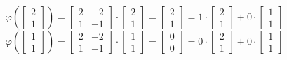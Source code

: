 \documentclass[a4paper, 12pt]{report}
\begin{document}
        $$
        \varphi\left(
            \begin{bmatrix}
                2\\
                1
            \end{bmatrix}\right)=
            \begin{bmatrix}
                2 & -2\\
                1 & -1
            \end{bmatrix}\cdot
            \begin{bmatrix}
                2\\
                1
            \end{bmatrix}=
            \begin{bmatrix}
                2\\
                1
            \end{bmatrix}
            =1 \cdot
            \begin{bmatrix}
                2\\
                1
            \end{bmatrix}
            +0\cdot
            \begin{bmatrix}
                1\\
                1
            \end{bmatrix}
        $$
        $$
        \varphi\left(
            \begin{bmatrix}
                1\\
                1
            \end{bmatrix}\right)=
            \begin{bmatrix}
                2 & -2\\
                1 & -1
            \end{bmatrix}\cdot
            \begin{bmatrix}
                1\\
                1
            \end{bmatrix}=
            \begin{bmatrix}
                0\\
                0
            \end{bmatrix}
            =0 \cdot
            \begin{bmatrix}
                2\\
                1
            \end{bmatrix}
            +0\cdot
            \begin{bmatrix}
                1\\
                1
            \end{bmatrix}
        $$
\end{document}
